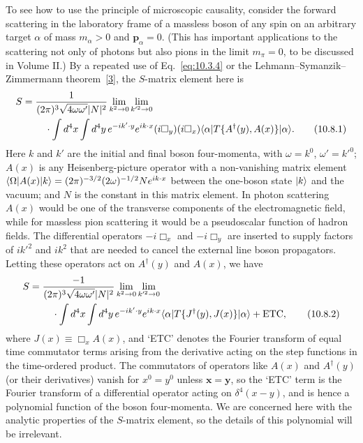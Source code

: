 To see how to use the principle of microscopic causality, consider the
forward scattering in the laboratory frame of a massless boson of any spin on
an arbitrary target $\alpha$ of mass $m_\alpha>0$ and $\mathbf p_\alpha=0$.
(This has important applications to the scattering not only of photons but
also pions in the limit $m_\pi=0$, to be discussed in Volume II.) By a repeated
use of Eq.~\eqref{eq:10.3.4} or the Lehmann--Symanzik--Zimmermann
theorem~\hyperref[ref:10.3]{[3]}, the $S$-matrix element here is
\begin{align}
  S={}&\frac{1}{(2\pi)^3\sqrt{4\omega\omega'}|N|^2}
  \lim_{k^2\to0}\lim_{k'^2\to0}\notag\\
  &\quad\cdot\int d^4x\int d^4y\,e^{-ik'\cdot y}e^{ik\cdot x}
  (i\Box_y)(i\Box_x)
  \langle \alpha\rvert T\{A^\dagger(y),A(x)\}\lvert \alpha\rangle.
  \tag{10.8.1}\label{eq:10.8.1}
\end{align}
Here $k$ and $k'$ are the initial and final boson four-momenta, with
$\omega=k^0$, $\omega'=k'^0$; $A(x)$ is any Heisenberg-picture operator
with a non-vanishing matrix element
$\langle \Omega\rvert A(x)\lvert k\rangle=(2\pi)^{-3/2}(2\omega)^{-1/2}Ne^{ik\cdot x}$
between the one-boson state $\lvert k\rangle$ and the vacuum; and $N$ is the
constant in this matrix element. In photon scattering $A(x)$ would be one
of the transverse components of the electromagnetic field, while for massless
pion scattering it would be a pseudoscalar function of hadron fields. The
differential operators $-i\Box_x$ and $-i\Box_y$ are inserted to supply
factors of $ik'^2$ and $ik^2$ that are needed to cancel the external line
boson propagators. Letting these operators act on $A^\dagger(y)$ and $A(x)$,
we have
\begin{align}
  S={}&\frac{-1}{(2\pi)^3\sqrt{4\omega\omega'}|N|^2}
  \lim_{k^2\to0}\lim_{k'^2\to0}\notag\\
  &\quad\cdot\int d^4x\int d^4y\,e^{-ik'\cdot y}e^{ik\cdot x}
  \langle \alpha\rvert T\{J^\dagger(y),J(x)\}\lvert \alpha\rangle+\mathrm{ETC},
  \tag{10.8.2}\label{eq:10.8.2}
\end{align}
where $J(x)\equiv\Box_xA(x)$, and `ETC' denotes the Fourier transform
of equal time commutator terms arising from the derivative acting on the
step functions in the time-ordered product. The commutators of operators
like $A(x)$ and $A^\dagger(y)$ (or their derivatives) vanish for $x^0=y^0$
unless $\mathbf{x}=\mathbf{y}$, so the `ETC' term is the Fourier transform
of a differential operator acting on $\delta^4(x-y)$, and is hence a
polynomial function of the boson four-momenta. We are concerned here with
the analytic properties of the $S$-matrix element, so the details of this
polynomial will be irrelevant.

